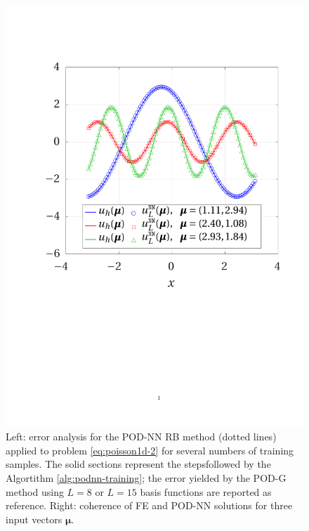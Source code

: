 \documentclass[12pt, a4paper, twoside, openright, notitlepage]{report}
\numberwithin{equation}{chapter}
\theoremstyle{theorem}
\theoremstyle{definition}
\theoremstyle{remark}
\theoremstyle{proposition}
\numberwithin{figure}{chapter}
\newcommand{\bg}[1]{\boldsymbol{#1}}
\begin{document}
\begin{figure}[t!]
			\includegraphics[scale = 0.42, trim = {1cm 9cm 1.5cm 3.5cm}, clip]{poisson1d_2_fe_vs_podnn}
			
			\caption{Left: error analysis for the POD-NN RB method (dotted lines) applied to problem \eqref{eq:poisson1d-2} for several numbers of training samples. The solid sections represent the stepsfollowed by the Algortithm \ref{alg:podnn-training}; the error yielded by the POD-G method using $L = 8$ or $L = 15$ basis functions are reported as reference. Right: coherence of FE and POD-NN solutions for three input vectors $\bg{\mu}$.}
			\label{fig:poisson1d-2-fig2}
		\end{figure}
		
\end{document}
